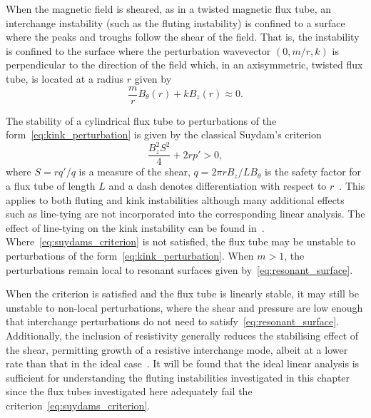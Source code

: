 When the magnetic field is sheared, as in a twisted magnetic flux tube, an interchange instability (such as the fluting instability) is confined to a surface where the peaks and troughs follow the shear of the field. That is, the instability is confined to the surface where the perturbation wavevector $(0, m/r, k)$ is perpendicular to the direction of the field which, in an axisymmetric, twisted flux tube, is located at a radius $r$ given by
\begin{equation}
  \label{eq:resonant_surface}
\frac{m}{r} B_{\theta}(r) + kB_z(r) \approx 0.
\end{equation}

The stability of a cylindrical flux tube to perturbations of the form~\eqref{eq:kink_perturbation} is given by the classical Suydam's criterion
\begin{equation}
  \label{eq:suydams_criterion}
\frac{B_z^2 S^2}{4} + 2 r p' > 0,
\end{equation}
where $S = r q'/q$ is a measure of the shear, $q = 2\pi r B_z / L B_{\theta}$ is the safety factor for a flux tube of length $L$ and a dash denotes differentiation with respect to $r$~\cite{mikhailovskiiInstabilitiesConfinedPlasma1998}. This applies to both fluting and kink instabilities although many additional effects such as line-tying are not incorporated into the corresponding linear analysis. The effect of line-tying on the kink instability can be found in~\cite{hoodKinkInstabilitySolar1979}. Where~\eqref{eq:suydams_criterion} is not satisfied, the flux tube may be unstable to perturbations of the form~\eqref{eq:kink_perturbation}. When $m>1$, the perturbations remain local to resonant surfaces given by~\eqref{eq:resonant_surface}.

When the criterion is satisfied and the flux tube is linearly stable, it may still be unstable to non-local perturbations, where the shear and pressure are low enough that interchange perturbations do not need to satisfy~\eqref{eq:resonant_surface}. Additionally, the inclusion of resistivity generally reduces the stabilising effect of the shear, permitting growth of a resistive interchange mode, albeit at a lower rate than that in the ideal case~\cite{mikhailovskiiInstabilitiesConfinedPlasma1998}. It will be found that the ideal linear analysis is sufficient for understanding the fluting instabilities investigated in this chapter since the flux tubes investigated here adequately fail the criterion~\eqref{eq:suydams_criterion}.


